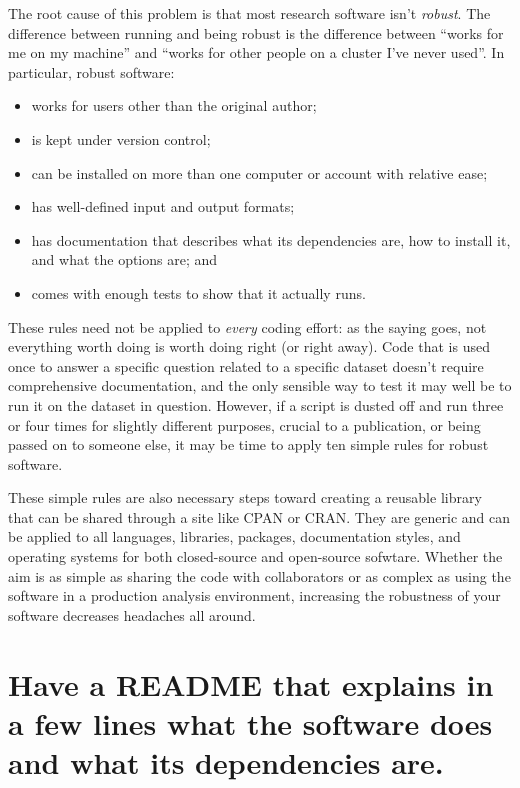 \documentclass[10pt]{article}
\begin{document}
The root cause of this problem is that most research software
isn't \emph{robust}. The difference between running and being
robust is the difference between ``works for me on my machine'' and
``works for other people on a cluster I've never used''. In particular,
robust software:

\begin{itemize}
\item
  works for users other than the original author;
\item
  is kept under version control;
\item
  can be installed on more than one computer or account with relative ease;
\item
  has well-defined input and output formats;
\item
  has documentation that describes what its dependencies are, how to
  install it, and what the options are; and
\item
  comes with enough tests to show that it actually runs.
\end{itemize}

These rules need not be applied to \emph{every} coding effort:
as the saying goes, not everything worth doing is worth doing right (or right away).
Code  that is used once to answer a specific question related to a specific dataset
doesn't require comprehensive documentation,
and the only sensible way to test it may well be to run it on the dataset in question.
However, if a script is dusted off and run three or four
times for slightly different purposes,
crucial to a publication,
or being passed on to someone else,
it may be time to apply ten simple rules for robust software.

These simple rules are also necessary steps toward creating a reusable
library that can be shared through a site like CPAN or CRAN.  They are
generic and can be applied to all languages, libraries, packages,
documentation styles, and operating systems for both closed-source and
open-source sofwtare.  Whether the aim is as simple as sharing the
code with collaborators or as complex as using the software in a
production analysis environment, increasing the robustness of your
software decreases headaches all around.

\section{Have a README that explains in a few lines what the software does and what its dependencies are.}
\end{document}
